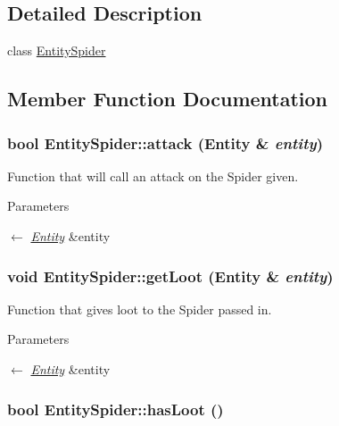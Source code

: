 \subsection{Detailed Description}
class \hyperlink{classEntitySpider}{EntitySpider} 

\subsection{Member Function Documentation}
\hypertarget{classEntitySpider_a2615ae9c4cda9978b94a8a701bf8d913}{
\subsubsection[{attack}]{\setlength{\rightskip}{0pt plus 5cm}bool EntitySpider::attack ({\bf Entity} \& {\em entity})}}
\label{classEntitySpider_a2615ae9c4cda9978b94a8a701bf8d913}


Function that will call an attack on the Spider given. 
\begin{DoxyParams}{Parameters}
\item[\mbox{$\leftarrow$} {\em \hyperlink{classEntity}{Entity}}]\&entity \end{DoxyParams}
\hypertarget{classEntitySpider_a5689fd02690ec82fc7552043ed659ce9}{
\subsubsection[{getLoot}]{\setlength{\rightskip}{0pt plus 5cm}void EntitySpider::getLoot ({\bf Entity} \& {\em entity})}}
\label{classEntitySpider_a5689fd02690ec82fc7552043ed659ce9}


Function that gives loot to the Spider passed in. 
\begin{DoxyParams}{Parameters}
\item[\mbox{$\leftarrow$} {\em \hyperlink{classEntity}{Entity}}]\&entity \end{DoxyParams}
\hypertarget{classEntitySpider_a3df1dba43521c84cfb50cd5f0c3abd67}{
\subsubsection[{hasLoot}]{\setlength{\rightskip}{0pt plus 5cm}bool EntitySpider::hasLoot ()}}
\label{classEntitySpider_a3df1dba43521c84cfb50cd5f0c3abd67}


